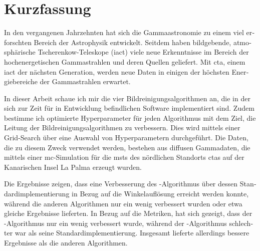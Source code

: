 \section*{Kurzfassung}
\begin{otherlanguage}{ngerman}
In den vergangenen Jahrzehnten hat sich die Gammaastronomie zu einem viel erforschten Bereich der
Astrophysik entwickelt. Seitdem haben bildgebende, atmosphärische Tscherenkow-Teleskope (\gls{iact})
viele neue Erkenntnisse im Bereich der hochenergetischen Gammastrahlen und deren Quellen geliefert.
Mit \gls{cta}, einem \gls{iact} der nächsten Generation, werden neue Daten in einigen der höchsten
Energiebereiche der Gammastrahlen erwartet.

In dieser Arbeit schaue ich mir die vier Bildreinigungsalgorithmen an, die in der sich zur Zeit für \cta{}
in Entwicklung befindlichen Software \ctapipe{} implementiert sind. Zudem bestimme ich optimierte
Hyperparameter für jeden Algorithmus mit dem Ziel, die Leitung der Bildreinigungsalgorithmen zu verbessern.
Dies wird mittels einer Grid-Search über eine Auswahl von Hyperparametern durchgeführt. Die Daten, die zu diesem
Zweck verwendet werden, bestehen aus diffusen Gammadaten, die mittels einer \gls{mc}-Simulation für die
\glspl{mst} des nördlichen Standorts \gls{cta}s auf der Kanarischen Insel La Palma erzeugt wurden.

Die Ergebnisse zeigen, dass eine Verbesserung des \tcc{}-Algorithmus über dessen Standardimplementierung
in Bezug auf die Winkelauflösung erreicht werden konnte, während die anderen Algorithmen nur ein wenig
verbessert wurden oder etwa gleiche Ergebnisse lieferten. In Bezug auf die Metriken, hat sich gezeigt,
dass der \tcc{}-Algorithmus nur ein wenig verbessert wurde, während der \fact{}-Algorithmus schlechter war als
seine Standardimplementierung. Insgesamt lieferte \fact{} allerdings bessere Ergebnisse als die anderen Algorithmen.


\end{otherlanguage}
\glsresetall
